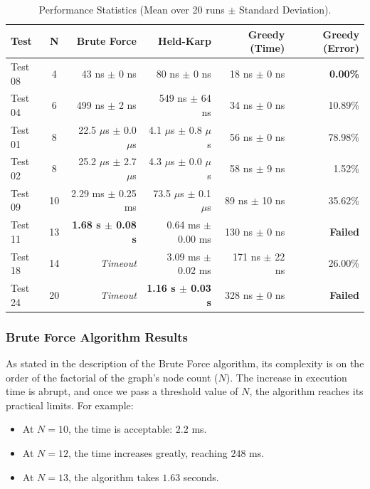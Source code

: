 \begin{table}[H]
    \centering
    \scriptsize 
    \caption{Performance Statistics (Mean over 20 runs $\pm$ Standard Deviation).}
    \label{tab:benchmark_stats}
    \begin{tabular}{|l|c|r|r|r|r|}
        \hline
        \textbf{Test} & \textbf{N} & \textbf{Brute Force} & \textbf{Held-Karp} & \textbf{Greedy (Time)} & \textbf{Greedy (Error)} \\
        \hline
        Test 08 & 4  & 43 ns $\pm$ 0 ns             & 80 ns $\pm$ 0 ns              & 18 ns $\pm$ 0 ns    & \textbf{0.00\%} \\
        Test 04 & 6  & 499 ns $\pm$ 2 ns            & 549 ns $\pm$ 64 ns            & 34 ns $\pm$ 0 ns    & 10.89\% \\
        Test 01 & 8  & 22.5 $\mu$s $\pm$ 0.0 $\mu$s & 4.1 $\mu$s $\pm$ 0.8 $\mu$s   & 56 ns $\pm$ 0 ns    & 78.98\% \\
        Test 02 & 8  & 25.2 $\mu$s $\pm$ 2.7 $\mu$s & 4.3 $\mu$s $\pm$ 0.0 $\mu$s   & 58 ns $\pm$ 9 ns    & 1.52\% \\
        Test 09 & 10 & 2.29 ms $\pm$ 0.25 ms        & 73.5 $\mu$s $\pm$ 0.1 $\mu$s  & 89 ns $\pm$ 10 ns   & 35.62\% \\
        Test 11 & 13 & \textbf{1.68 s $\pm$ 0.08 s} & 0.64 ms $\pm$ 0.00 ms         & 130 ns $\pm$ 0 ns   & \textbf{Failed} \\
        Test 18 & 14 & \textit{Timeout}             & 3.09 ms $\pm$ 0.02 ms         & 171 ns $\pm$ 22 ns  & 26.00\% \\
        Test 24 & 20 & \textit{Timeout}             & \textbf{1.16 s $\pm$ 0.03 s}  & 328 ns $\pm$ 0 ns   & \textbf{Failed} \\
        \hline
    \end{tabular}
\end{table}

\subsubsection{Brute Force Algorithm Results}

As stated in the description of the Brute Force algorithm, its complexity is on the order of the factorial of the graph's node count ($N$). 
The increase in execution time is abrupt, and once we pass a threshold value of $N$, the algorithm reaches its practical limits. 
For example:

\begin{itemize}
    \item At $N=10$, the time is acceptable: $2.2$ ms.
    \item At $N=12$, the time increases greatly, reaching $248$ ms.
    \item At $N=13$, the algorithm takes $1.63$ seconds.
\end{itemize}

